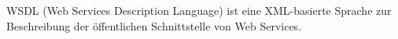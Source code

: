 \documentclass[runningheads]{llncs}
\begin{document}
    WSDL (Web Services Description Language) ist eine XML-basierte Sprache zur Beschreibung der öffentlichen Schnittstelle von Web Services.

%
%
%
%
\end{document}
